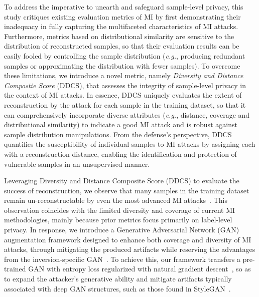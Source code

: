 To address the imperative to unearth and safeguard sample-level privacy, this study critiques existing evaluation metrics of MI by first demonstrating their inadequacy in fully capturing the multifaceted characteristics of MI attacks.
Furthermore, metrics based on distributional similarity are sensitive to the distribution of reconstructed samples, so that their evaluation results can be easily fooled by controlling the sample distribution (\emph{e.g.}, producing redundant samples or approximating the distribution with fewer samples).
To overcome these limitations, we introduce a novel metric, namely \textit{Diversity and Distance Compostie Score} (DDCS), that assesses the integrity of sample-level privacy in the context of MI attacks.
In essence, DDCS uniquely evaluates the extent of reconstruction by the attack for each sample in the training dataset, so that it can comprehensively incorporate diverse attributes (\emph{e.g.}, distance, coverage and distributional similarity) to indicate a good MI attack and is robust against sample distribution manipulations.
From the defense's perspective, DDCS quantifies the susceptibility of individual samples to MI attacks by assigning each with a reconstruction distance, enabling the identification and protection of vulnerable samples in an unsupervised manner.

Leveraging Diversity and Distance Composite Score (DDCS) to evaluate the success of reconstruction, we observe that many samples in the training dataset remain un-reconstructable by even the most advanced MI attacks~\cite{ppa22icml}.
This observation coincides with the limited diversity and coverage of current MI methodologies, mainly because prior metrics focus primarily on label-level privacy.
In response, we introduce a Generative Adversarial Network (GAN) augmentation framework designed to enhance both coverage and diversity of MI attacks, through mitigating the produced artifacts while reserving the advantages from the inversion-specific GAN~\cite{stylegan2_20cvpr, kedmi21iccv}.
To achieve this, our framework transfers a pre-trained GAN with entropy loss regularized with natural gradient descent~\cite{ngd}, so as to expand the attacker's generative ability and mitigate artifacts typically associated with deep GAN structures, such as those found in StyleGAN~\cite{stylegan2_20cvpr}.


